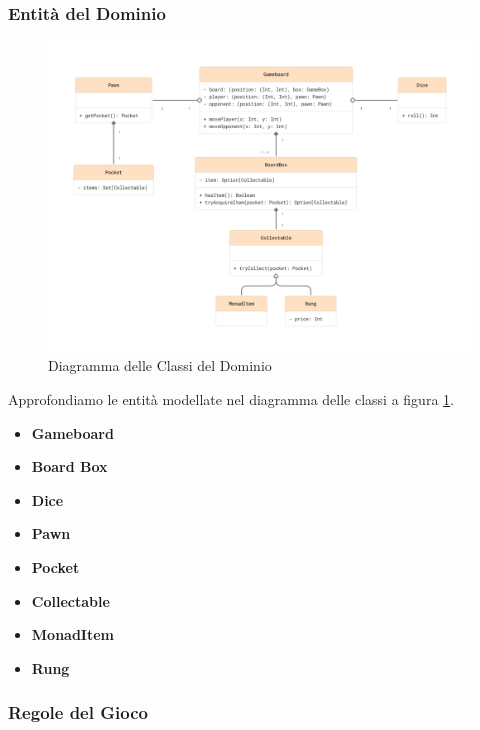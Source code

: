 \subsubsection{Entità del Dominio}
\begin{figure}[h!]
\centering
\includegraphics[width=1\textwidth]{figures/domain-class-diagram.png}
\caption{Diagramma delle Classi del Dominio}
\label{fig:domain-class-diagram}
\end{figure}
Approfondiamo le entità modellate nel diagramma delle classi 
a figura \ref{fig:domain-class-diagram}.
\begin{itemize}
    \item \textbf{Gameboard}\par
    \item \textbf{Board Box}\par
    \item \textbf{Dice}\par
    \item \textbf{Pawn}\par
    \item \textbf{Pocket}\par
    \item \textbf{Collectable}\par
    \item \textbf{MonadItem}\par
    \item \textbf{Rung}\par
\end{itemize}

\subsubsection{Regole del Gioco}